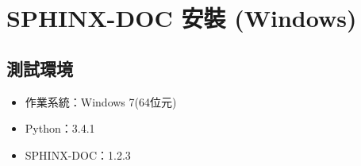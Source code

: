 \documentclass[letterpaper,10pt,english]{sphinxmanual}
\begin{document}
\chapter{SPHINX-DOC 安裝 (Windows)}
\label{_doc/sphinx-doc-win/index:sphinx-doc-windows}\label{_doc/sphinx-doc-win/index::doc}

\section{測試環境}
\label{_doc/sphinx-doc-win/index:id1}\begin{itemize}
\item {} 
作業系統：Windows 7(64位元)

\item {} 
Python：3.4.1

\item {} 
SPHINX-DOC：1.2.3

\end{itemize}
\end{document}
